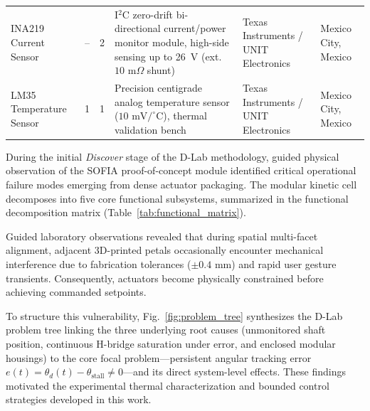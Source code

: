 \documentclass[lettersize,journal]{IEEEtran}
\begin{document}
\begin{table}[!t]
\begin{tabular}{p{3.2cm} c c p{5.0cm} p{2.8cm} p{2.5cm}}
			INA219 Current Sensor & -- & 2 & I$^2$C zero-drift bi-directional current/power monitor module, high-side sensing up to 26~V (ext. $10\text{ m}\Omega$ shunt) & Texas Instruments / UNIT Electronics & Mexico City, Mexico \\
			LM35 Temperature Sensor & 1 & 1 & Precision centigrade analog temperature sensor ($10\text{ mV}/^\circ\text{C}$), thermal validation bench & Texas Instruments / UNIT Electronics & Mexico City, Mexico \\
			\bottomrule
		\end{tabular}
	\end{table}
	
	During the initial \textit{Discover} stage of the D-Lab methodology, guided physical observation of the SOFIA proof-of-concept module identified critical operational failure modes emerging from dense actuator packaging. The modular kinetic cell decomposes into five core functional subsystems, summarized in the functional decomposition matrix (Table~\ref{tab:functional_matrix}).
	
	Guided laboratory observations revealed that during spatial multi-facet alignment, adjacent 3D-printed petals occasionally encounter mechanical interference due to fabrication tolerances ($\pm 0.4\text{ mm}$) and rapid user gesture transients. Consequently, actuators become physically constrained before achieving commanded setpoints. 
	
	To structure this vulnerability, Fig.~\ref{fig:problem_tree} synthesizes the D-Lab problem tree linking the three underlying root causes (unmonitored shaft position, continuous H-bridge saturation under error, and enclosed modular housings) to the core focal problem—persistent angular tracking error $e(t) = \theta_d(t) - \theta_{\text{stall}} \neq 0$—and its direct system-level effects. These findings motivated the experimental thermal characterization and bounded control strategies developed in this work.
	
\end{document}
